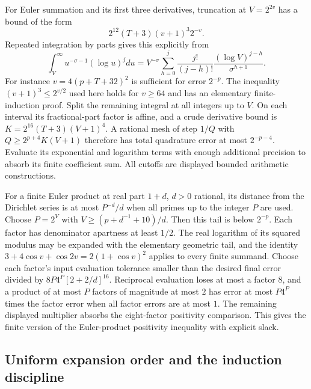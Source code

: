 For Euler summation and its first three derivatives, truncation at
$V=2^{2v}$ has a bound of the form
\[
 2^{12}(T+3)(v+1)^3 2^{-v}.
\]
Repeated integration by parts gives this explicitly from
\[
 \int_V^\infty u^{-\sigma-1}(\log u)^jdu
 =V^{-\sigma}\sum_{h=0}^j
    \frac{j!}{(j-h)!}\frac{(\log V)^{j-h}}{\sigma^{h+1}}.
\]
For instance $v=4(p+T+32)^2$ is sufficient for error $2^{-p}$.
The inequality $(v+1)^3\le2^{v/2}$ used here holds for $v\ge64$
and has an elementary finite-induction proof. Split the remaining
integral at all integers up to $V$. On each interval its fractional-part
factor is affine, and a crude derivative bound is
$K=2^{16}(T+3)(V+1)^4$. A rational mesh of step $1/Q$ with
$Q\ge2^{p+4}K(V+1)$ therefore has total quadrature error at most
$2^{-p-4}$. Evaluate its exponential and logarithm terms with enough
additional precision to absorb its finite coefficient sum. All cutoffs
are displayed bounded arithmetic constructions.

For a finite Euler product at real part $1+d$, $d>0$ rational, its
distance from the Dirichlet series is at most $P^{-d}/d$ when all
primes up to the integer $P$ are used. Choose
$P=2^V$ with $V\ge(p+d^{-1}+10)/d$. Then this tail is below $2^{-p}$.
Each factor has denominator apartness at least $1/2$. The real
logarithm of its squared modulus may be expanded with the elementary
geometric tail, and the identity
$3+4\cos v+\cos2v=2(1+\cos v)^2$ applies to every finite summand.
Choose each factor's input evaluation tolerance smaller than the desired
final error divided by $8P4^P[2+2/d]^{16}$. Reciprocal evaluation loses
at most a factor $8$, and a product of at most $P$ factors of magnitude
at most $2$ has error at most $P4^P$ times the factor error when all
factor errors are at most $1$. The remaining displayed multiplier
absorbs the eight-factor positivity comparison. This gives the finite version of the Euler-product
positivity inequality with explicit slack.

\subsection{Uniform expansion order and the induction discipline}

